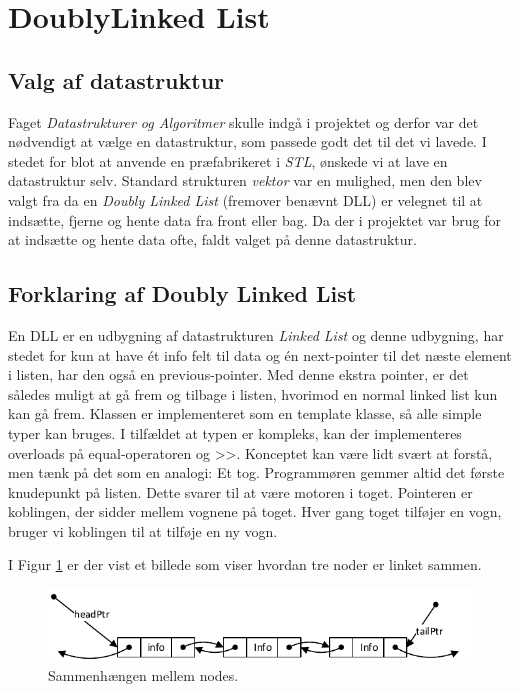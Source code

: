 \section{DoublyLinked List} \label{sec:DoublyLinkedList_impl}

\subsection{Valg af datastruktur}

Faget \textit{Datastrukturer og Algoritmer} skulle indgå i projektet og derfor var det nødvendigt at vælge en datastruktur, som passede godt det til det vi lavede. 
I stedet for blot at anvende en præfabrikeret i \textit{STL}, ønskede vi at lave en datastruktur selv. 
Standard strukturen \textit{vektor} var en mulighed, men den blev valgt fra da en \textit{Doubly Linked List} (fremover benævnt DLL) er velegnet til at indsætte, fjerne og hente data fra front eller bag. 
Da der i projektet var brug for at indsætte og hente data ofte, faldt valget på denne datastruktur.

\subsection{Forklaring af Doubly Linked List}

En DLL er en udbygning af datastrukturen \textit{Linked List} og denne udbygning, har stedet for kun at have ét info felt til data og én next-pointer til det næste element i listen, har den også en previous-pointer. 
Med denne ekstra pointer, er det således muligt at gå frem og tilbage i listen, hvorimod en normal linked list kun kan gå frem. Klassen er implementeret som en template klasse, så alle simple typer kan bruges. I tilfældet at typen er kompleks, kan der implementeres overloads på equal-operatoren og >>.
Konceptet kan være lidt svært at forstå, men tænk på det som en analogi: Et tog. Programmøren gemmer altid det første knudepunkt på listen. 
Dette svarer til at være motoren i toget. Pointeren er koblingen, der sidder mellem vognene på toget. Hver gang toget tilføjer en vogn, bruger vi koblingen til at tilføje en ny vogn.

I Figur \ref{fig:nodes_cohe} er der vist et billede som viser hvordan tre noder er linket sammen.

\begin{figure}[ht]
\centering
\includegraphics[width=\textwidth-5cm]{../fig/linkedNodes.pdf}
\caption{Sammenhængen mellem nodes.}
\label{fig:nodes_cohe}
\end{figure}

